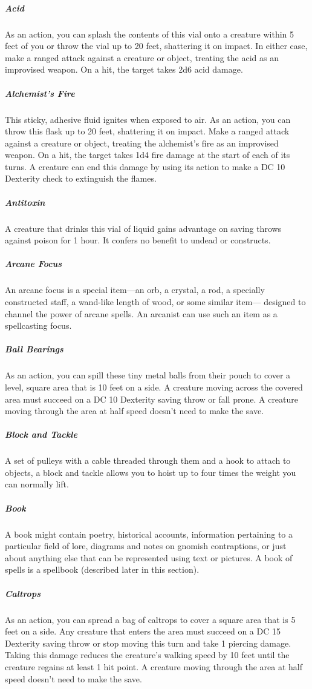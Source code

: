 \subparagraph*{Acid} As an action, you can splash the contents of this vial onto a creature within 5 feet of you or throw the vial up to 20 feet, shattering it on impact. In either case, make a ranged attack against a creature or object, treating the acid as an improvised weapon. On a hit, the target takes 2d6 acid damage.

\subparagraph*{Alchemist's Fire} This sticky, adhesive fluid ignites when exposed to air. As an action, you can throw this flask up to 20 feet, shattering it on impact. Make a ranged attack against a creature or object, treating the alchemist's fire as an improvised weapon. On a hit, the target takes 1d4 fire damage at the start of each of its turns. A creature can end this damage by using its action to make a DC 10 Dexterity check to extinguish the flames.

\subparagraph*{Antitoxin} A creature that drinks this vial of liquid gains advantage on saving throws against poison for 1 hour. It confers no benefit to undead or constructs.

\subparagraph*{Arcane Focus} An arcane focus is a special item—an orb, a crystal, a rod, a specially constructed staff, a wand-like length of wood, or some similar item— designed to channel the power of arcane spells. An arcanist can use such an item as a spellcasting focus.

\subparagraph*{Ball Bearings} As an action, you can spill these tiny metal balls from their pouch to cover a level, square area that is 10 feet on a side. A creature moving across the covered area must succeed on a DC 10 Dexterity saving throw or fall prone. A creature moving through the area at half speed doesn't need to make the save.

\subparagraph*{Block and Tackle} A set of pulleys with a cable threaded through them and a hook to attach to objects, a block and tackle allows you to hoist up to four times the weight you can normally lift.

\subparagraph*{Book} A book might contain poetry, historical accounts, information pertaining to a particular field of lore, diagrams and notes on gnomish contraptions, or just about anything else that can be represented using text or pictures. A book of spells is a spellbook (described later in this section).

\subparagraph*{Caltrops} As an action, you can spread a bag of caltrops to cover a square area that is 5 feet on a side. Any creature that enters the area must succeed on a DC 15 Dexterity saving throw or stop moving this turn and take 1 piercing damage. Taking this damage reduces the creature's walking speed by 10 feet until the creature regains at least 1 hit point. A creature moving through the area at half speed doesn't need to make the save.

